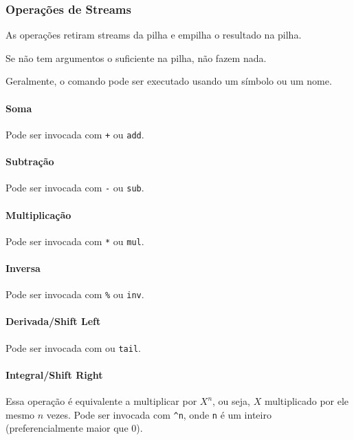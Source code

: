 \documentclass{article}
\begin{document}
\subsubsection{Operações de Streams}

As operações retiram streams da pilha
e empilha o resultado na pilha.

Se não tem argumentos o suficiente na pilha,
não fazem nada.

Geralmente, o comando pode ser executado
usando um símbolo ou um nome.

\paragraph{Soma}

Pode ser invocada com \texttt{+} ou \texttt{add}.

\paragraph{Subtração}

Pode ser invocada com \texttt{-} ou \texttt{sub}.

\paragraph{Multiplicação}

Pode ser invocada com \texttt{*} ou \texttt{mul}.

\paragraph{Inversa}

Pode ser invocada com \texttt{\%} ou \texttt{inv}.

\paragraph{Derivada/Shift Left}

Pode ser invocada com \texttt{\textquotesingle{}} ou \texttt{tail}.

\paragraph{Integral/Shift Right}

Essa operação é equivalente a multiplicar
por \(X^n\), ou seja, \(X\) multiplicado por ele mesmo \(n\) vezes.
Pode ser invocada com \texttt{\textasciicircum{}n},
onde \texttt{n} é um inteiro (preferencialmente maior que 0).
\end{document}
